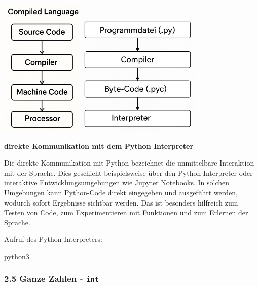 \documentclass[
  11pt,
  a4paper,
  DIV=11,
  numbers=noendperiod]{scrartcl}
\newenvironment{Shaded}{\begin{snugshade}}{\end{snugshade}}
\newcommand{\ExtensionTok}[1]{\textcolor[rgb]{0.00,0.23,0.31}{#1}}
\begin{document}
\includegraphics[width=1.5625in,height=\textheight,keepaspectratio]{images/compiler.jpg}
\includegraphics[width=2.29167in,height=\textheight,keepaspectratio]{images/interpreter.jpg}

\textbf{direkte Kommunikation mit dem Python Interpreter}

Die direkte Kommunikation mit Python bezeichnet die unmittelbare
Interaktion mit der Sprache. Dies geschieht beispielsweise über den
Python-Interpreter oder interaktive Entwicklungsumgebungen wie Jupyter
Notebooks. In solchen Umgebungen kann Python-Code direkt eingegeben und
ausgeführt werden, wodurch sofort Ergebnisse sichtbar werden. Das ist
besonders hilfreich zum Testen von Code, zum Experimentieren mit
Funktionen und zum Erlernen der Sprache.

Aufruf des Python-Interpreters:

\begin{Shaded}
\begin{Highlighting}[numbers=left,,]
\ExtensionTok{python3}
\end{Highlighting}
\end{Shaded}

\subsubsection{\texorpdfstring{2.5 Ganze Zahlen -
\texttt{int}}{2.5 Ganze Zahlen - int}}\label{ganze-zahlen---int}
\end{document}

